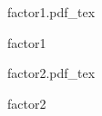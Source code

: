 \documentclass[12pt,a4paper]{article}
\newcommand{\incfig}[1]{%
    \def\svgwidth{\columnwidth}
    {#1.pdf_tex}
}
\begin{document}
\begin{figure}[ht]
    \centering
	\begin{minipage}[c][\totalheight][c]{0.95\columnwidth}
    \incfig{factor1}
    \caption{factor1}
	\end{minipage}
    \label{fig:factor1}
\end{figure}

\begin{figure}[ht]
    \centering
	\begin{minipage}[c][\totalheight][c]{0.9\columnwidth}
    \incfig{factor2}
    \caption{factor2}
	\end{minipage}
    \label{fig:factor2}
\end{figure}
\end{document}
